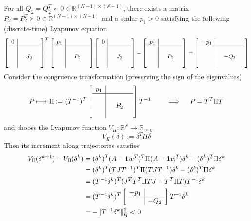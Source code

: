 \documentclass{book}
\newcommand{\R}{\mathbb{R}}
\theoremstyle{theoremv2}
\theoremstyle{defv2}
\theoremstyle{remark}
\theoremstyle{remark}
\theoremstyle{definition}
\theoremstyle{definition}
\begin{document}
For all $Q_2=Q_2^T \succ 0 \in\R^{(N-1)\times(N-1)}$, there exists a matrix $P_2=P_2^T \succ 0 \in\R^{(N-1)\times(N-1)}$ and a scalar $p_1>0$ satisfying the following (discrete-time) Lyapunov equation
\[
    \left[\begin{array}{c| c c c }
        0 & & & \\ \hline \\ & & J_2 & \\ & & & 
    \end{array}\right]^T \left[\begin{array}{c| c c c }
        p_1 & & & \\ \hline \\ & & P_2 & \\ & & & 
    \end{array}\right] \left[\begin{array}{c| c c c }
        0 & & & \\ \hline \\ & & J_2 & \\ & & & 
    \end{array}\right] - \left[\begin{array}{c| c c c }
        p_1 & & & \\ \hline \\ & & P_2 & \\ & & & 
    \end{array}\right] = \left[\begin{array}{c| c c c }
        -p_1 & & & \\ \hline \\ & & -Q_2 & \\ & & & 
    \end{array}\right]
\]
Consider the congruence transformation (preserving the sign of the eigenvalues)
\[
    P \longmapsto \Pi := (T^{-1})^T \left[\begin{array}{c| c c c }
        p_1 & & & \\ \hline \\ & & P_2 & \\ & & & 
    \end{array}\right] T^{-1} \qquad \implies \quad P = T^T\Pi T
\]
and choose the Lyapunov function $V_\Pi:\R^N\to \R_{\geq0}$ 
\[
    V_\Pi(\delta) := \delta^T\Pi\delta
\]
Then its increment along trajectories satisfies
\begin{align*}
    V_\Pi(\delta^{k+1})-V_\Pi(\delta^k) &= (\delta^k)^T(A-\boldsymbol{1}w^T)^T\Pi(A-\boldsymbol{1}w^T)\delta^k-(\delta^k)^T\Pi\delta^k \\
    &= (\delta^k)^T(TJT^{-1})^T\Pi(TJT^{-1})\delta^k - (\delta^k)^T\Pi\delta^k \\ 
    &= (T^{-1}\delta^k)^T(J^TT^T\Pi TJ-T^T\Pi T)T^{-1}\delta^k \\ 
    &= (T^{-1}\delta^k)^T \left[\begin{array}{c|c}
        -p_1 & \\ \hline & -Q_2 
    \end{array}\right] T^{-1}\delta^k\\ 
    &= -\|T^{-1}\delta^k\|^2_Q < 0
\end{align*}
\end{document}
